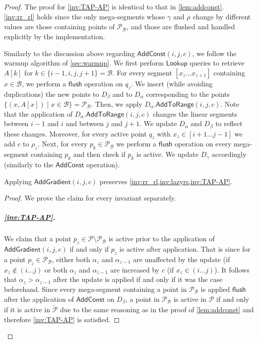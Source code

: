 \documentclass[a4paper,UKenglish,cleveref, autoref, thm-restate]{lipics-v2021}
\newcommand{\AC}{\mathsf{AddConst}}
\newcommand{\AtR}{\mathsf{AddToRange}}
\newcommand{\AG}{\mathsf{AddGradient}}
\newcommand{\Lookup}{\mathsf{Lookup}}
\renewcommand{\P}{\mathcal{P}}
\newcommand{\DAL}{D_{\alpha}}
\newcommand{\Dbeta}{D_{\beta}}
\newcommand{\DGAM}{D_{\gamma}}
\newcommand{\TP}{\tilde{\P}}
\newcommand{\para}[1]{\vspace{-0.1in} \subparagraph*{#1}}
\newcommand{\B}{\mathcal{B}}
\newcommand{\rl}[1]{\rho_{#1}}
\newcommand{\flush}{\mathsf{flush}}
\begin{document}
\begin{proof}
The proof for \cref{inv:TAP-AP} is identical to that in \cref{lem:addconst}. 
\cref{inv:rr_rl} holds since the only mega-segments whose $\gamma$ and $\rl{}$ change by different values are those containing points of $\P_{\B}$, and those are flushed and handled explicitly by the implementation.
  
\iffalse 
Similarly to the discussion above regarding $\AC(i,j,c)$, we follow the warmup algorithm of \cref{sec:warmup}.
We first perform $\Lookup$ queries to retrieve $A[k]$ for $k\in\{i-1,i,j,j+1\}=\B$.
For every segment $[x_z \ldots x_{z+1}]$ containing $x\in \B$, we perform a $\flush$ operation on $q_z$.
We insert (while avoiding duplications) the new points to $\Dbeta$ and to $\DAL$ corresponding to the points $\{(x,A[x])\mid x\in \B\}=\P_{\B}$.
Then, we apply $\DAL.\AtR(i,j,c)$. 
Note that the application of $\DAL.\AtR(i,j,c)$ changes the linear segments between $i-1$ and $i$ and between $j$ and $j+1$.
We update $\DAL$ and $\Dbeta$ to reflect these changes.
Moreover, for every active point $q_z$ with $x_z\in [i+1\ldots j-1]$ we add $c$ to $\rl{z}$.
Next, for every $p_k \in \P_{\B}$ we perform a $\flush$ operation on every mega-segment containing $p_k$ and then check if $p_k$ is active.
We update $\DGAM$ accordingly (similarly to the $\AC$ operation).

\begin{lemma}\label{lem:addgrad}
    Applying $\AG(i,j,c)$ preserves \cref{inv:rr_rl,inv:lazyrs,inv:TAP-AP}.
\end{lemma}
\begin{proof}
We prove the claim for every invariant separately.
\para{\cref{inv:TAP-AP}.}
We claim that a point $p_z \in \P \setminus \P_{\B}$ is active prior to the application of $\AG(i,j,c)$ if and only if $p_z$ is active after application.
That is since for a point $p_z \in \P_{\B}$, either both $\alpha_z$ and $\alpha_{z-1}$ are unaffected by the update (if $x_z \notin (i\ldots j)$ or both $\alpha_z$ and $\alpha_{z-1}$ are increased by $c$ (if $x_z \in (i\ldots j)$).
It follows that $\alpha_z >\alpha_{z-1}$ after the update is applied if and only if it was the case beforehand.
Since every mega-segment containing a point in $\P_{\B}$ is applied $\flush$ after the application of $\AC$ on $\Dbeta$, a point in $\P_{\B}$ is active in $\P$ if and only if it is active in $\TP$ due to the same reasoning as in the proof of \cref{lem:addconst} and therefore \cref{inv:TAP-AP} is satisfied.


\end{proof}
\end{proof}
\end{document}
